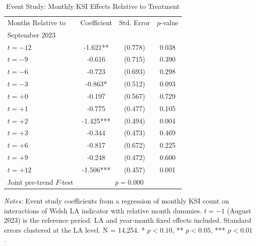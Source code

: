\begin{table}[H]
\centering
\caption{Event Study: Monthly KSI Effects Relative to Treatment}
\label{tab:eventstudy}
\begin{threeparttable}
\begin{tabular}{lccc}
\toprule
Months Relative to & Coefficient & Std. Error & $p$-value \\
September 2023 & & & \\
\midrule
$t = -12$ & -1.621** & (0.778) & 0.038 \\
$t = -9$ & -0.616 & (0.715) & 0.390 \\
$t = -6$ & -0.723 & (0.693) & 0.298 \\
$t = -3$ & -0.863* & (0.512) & 0.093 \\
$t = +0$ & -0.197 & (0.567) & 0.729 \\
$t = +1$ & -0.775 & (0.477) & 0.105 \\
$t = +2$ & -1.425*** & (0.494) & 0.004 \\
$t = +3$ & -0.344 & (0.473) & 0.469 \\
$t = +6$ & -0.817 & (0.672) & 0.225 \\
$t = +9$ & -0.248 & (0.472) & 0.600 \\
$t = +12$ & -1.506*** & (0.457) & 0.001 \\
\midrule
Joint pre-trend $F$-test & \multicolumn{3}{c}{$p = 0.000$} \\
\bottomrule
\end{tabular}
\begin{tablenotes}[flushleft]
\small
\item \textit{Notes:} Event study coefficients from a regression of monthly KSI count on interactions of Welsh LA indicator with relative month dummies. $t = -1$ (August 2023) is the reference period. LA and year-month fixed effects included. Standard errors clustered at the LA level. N = 14,254. * $p<0.10$, ** $p<0.05$, *** $p<0.01$.
\end{tablenotes}
\end{threeparttable}
\end{table}
